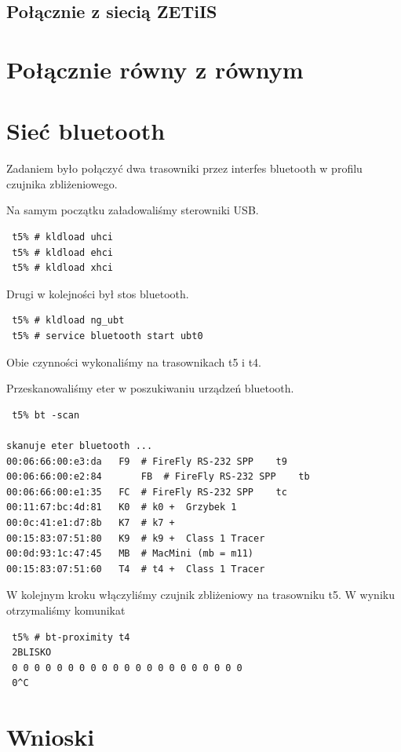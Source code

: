 \documentclass[a4paper,11pt,notitlepage]{article}
\begin{document}
\subsection{Połącznie z siecią ZETiIS}



\section{Połącznie równy z równym}



\section{Sieć bluetooth} 

Zadaniem było połączyć dwa trasowniki przez interfes bluetooth w profilu czujnika zbliżeniowego.

Na samym początku załadowaliśmy sterowniki USB.
\begin{verbatim}
 t5% # kldload uhci
 t5% # kldload ehci
 t5% # kldload xhci
\end{verbatim}
Drugi w kolejności był stos bluetooth.
\begin{verbatim}
 t5% # kldload ng_ubt
 t5% # service bluetooth start ubt0
\end{verbatim}
Obie czynności wykonaliśmy na trasownikach t5 i t4.

Przeskanowaliśmy eter w poszukiwaniu urządzeń bluetooth.
\begin{verbatim}
 t5% bt -scan

skanuje eter bluetooth ...
00:06:66:00:e3:da	F9	# FireFly RS-232 SPP 	t9
00:06:66:00:e2:84       FB	# FireFly RS-232 SPP 	tb
00:06:66:00:e1:35	FC	# FireFly RS-232 SPP	tc
00:11:67:bc:4d:81	K0	# k0 +	Grzybek 1
00:0c:41:e1:d7:8b	K7	# k7 +
00:15:83:07:51:80	K9	# k9 +	Class 1 Tracer
00:0d:93:1c:47:45	MB	# MacMini (mb = m11)
00:15:83:07:51:60	T4	# t4 +	Class 1 Tracer
\end{verbatim}

W kolejnym kroku włączyliśmy czujnik zbliżeniowy na trasowniku t5.
W wyniku otrzymaliśmy komunikat
\begin{verbatim}
 t5% # bt-proximity t4
 2BLISKO
 0 0 0 0 0 0 0 0 0 0 0 0 0 0 0 0 0 0 0 0 0
 0^C
\end{verbatim}

\section{Wnioski}
\end{document}
